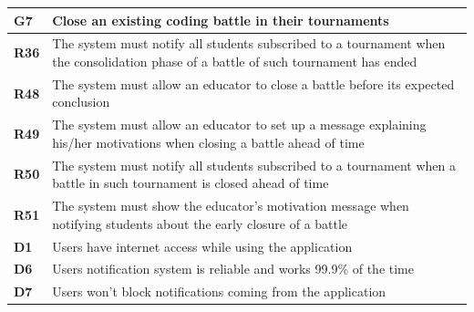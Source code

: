 \documentclass[../RASD.tex]{subfiles}
\begin{document}
        \restoregeometry
        \begin{table}[ht]
            \begin{center}
                \begin{tabular}{|m{2em}|m{30em}|}
                \hline
                \rowcolor{ReqMappingRow1}
                \textbf{G7} & \textbf{Close an existing coding battle in their tournaments}\\
                \hline
                \cellcolor{ReqMappingCell2}
                \textbf{R36} & The system must notify all students subscribed to a tournament when the consolidation phase of a battle of such tournament has ended\\
                \hline
                \cellcolor{ReqMappingCell2}
                \textbf{R48} & The system must allow an educator to close a battle before its expected conclusion\\
                \hline
                \cellcolor{ReqMappingCell2}
                \textbf{R49} & The system must allow an educator to set up a message explaining his/her motivations when closing a battle ahead of time\\
                \hline
                \cellcolor{ReqMappingCell2}
                \textbf{R50} & The system must notify all students subscribed to a tournament when a battle in such tournament is closed ahead of time\\
                \hline
                \cellcolor{ReqMappingCell2}
                \textbf{R51} & The system must show the educator's motivation message when notifying students about the early closure of a battle\\
                \hline
                \cellcolor{ReqMappingCell3}
                \textbf{D1} & Users have internet access while using the application\\
                \hline
                \cellcolor{ReqMappingCell3}
                \textbf{D6} & Users notification system is reliable and works 99.9\% of the time\\
                \hline
                \cellcolor{ReqMappingCell3}
                \textbf{D7} & Users won't block notifications coming from the application\\
                \hline
                \end{tabular}
            \end{center}
        \end{table}\newpage
\end{document}
